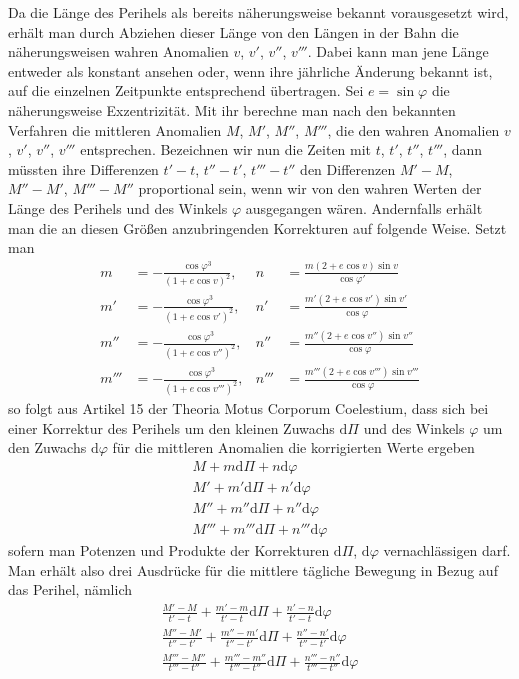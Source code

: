 Da die Länge des Perihels als bereits näherungsweise bekannt vorausgesetzt wird, erhält man durch Abziehen dieser Länge von den Längen in der Bahn die näherungsweisen wahren Anomalien $v$, $v'$, $v''$, $v'''$. Dabei kann man jene Länge entweder als konstant ansehen oder, wenn ihre jährliche Änderung bekannt ist, auf die einzelnen Zeitpunkte entsprechend übertragen. Sei $e=\sin\varphi$ die näherungsweise Exzentrizität. Mit ihr berechne man nach den bekannten Verfahren die mittleren Anomalien $M$, $M'$, $M''$, $M'''$, die den wahren Anomalien $v$, $v'$, $v''$, $v'''$ entsprechen. Bezeichnen wir nun die Zeiten mit $t$, $t'$, $t''$, $t'''$, dann müssten ihre Differenzen $t'-t$, $t''-t'$, $t'''-t''$ den Differenzen $M'-M$, $M''-M'$, $M'''-M''$ proportional sein, wenn wir von den wahren Werten der Länge des Perihels und des Winkels $\varphi$ ausgegangen wären. Andernfalls erhält man die an diesen Größen anzubringenden Korrekturen auf folgende Weise. Setzt man
\[
\begin{aligned}
m&=-\frac{\cos\varphi^3}{(1+e\cos v)^2},&n&=\frac{m(2+e\cos v)\sin v}{\cos\varphi'}\\[6pt]
m'&=-\frac{\cos\varphi^3}{(1+e\cos v')^2},&n'&=\frac{m'(2+e\cos v')\sin v'}{\cos\varphi}\\[6pt]
m''&=-\frac{\cos\varphi^3}{(1+e\cos v'')^2},&n''&=\frac{m''(2+e\cos v'')\sin v''}{\cos\varphi}\\[6pt]
m'''&=-\frac{\cos\varphi^3}{(1+e\cos v''')^2},&n'''&=\frac{m'''(2+e\cos v''')\sin v'''}{\cos\varphi}
\end{aligned}
\]
\noindent{}
so folgt aus Artikel 15 der Theoria Motus Corporum Coelestium, dass sich bei einer Korrektur des Perihels um den kleinen Zuwachs $\mathrm d\Pi$ und des Winkels $\varphi$ um den Zuwachs $\mathrm d\varphi$ für die mittleren Anomalien die korrigierten Werte ergeben
\[
\begin{gathered}
M+m\mathrm d\Pi+n\mathrm d\varphi\\
M'+m'\mathrm d\Pi+n'\mathrm d\varphi\\
M''+m''\mathrm d\Pi+n''\mathrm d\varphi\\
M'''+m'''\mathrm d\Pi+n'''\mathrm d\varphi
\end{gathered}
\]
sofern man Potenzen und Produkte der Korrekturen $\mathrm d\Pi$, $\mathrm d\varphi$ vernachlässigen darf. Man erhält also drei Ausdrücke für die mittlere tägliche Bewegung in Bezug auf das Perihel, nämlich
\[
\begin{gathered}
\frac{M'-M}{t'-t}+\frac{m'-m}{t'-t}\mathrm d\Pi+\frac{n'-n}{t'-t}\mathrm d\varphi\\[5pt]
\frac{M''-M'}{t''-t'}+\frac{m''-m'}{t''-t'}\mathrm d\Pi+\frac{n''-n'}{t''-t'}\mathrm d\varphi\\[5pt]
\frac{M'''-M''}{t'''-t''}+\frac{m'''-m''}{t'''-t''}\mathrm d\Pi+\frac{n'''-n''}{t'''-t''}\mathrm d\varphi
\end{gathered}
\]
